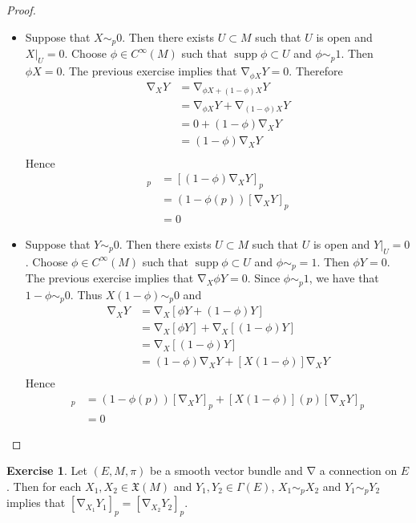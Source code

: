 \documentclass{book}
\theoremstyle{definition}
\newtheorem{ex}[definition]{Exercise}
\newcommand{\Gam}{\Gamma}
\newcommand{\MFX}{\mathfrak{X}}
\DeclareMathOperator{\supp}{supp}
\DeclareMathOperator{\nab}{\nabla}
\DeclareMathOperator*{\0}{\mbf{0}}
\DeclareMathOperator*{\1}{\mbf{1}}
\begin{document}
	\begin{proof}\
		\begin{itemize}
			\item Suppose that $X \sim_p 0$. Then there exists $U \subset M$ such that $U$ is open and $X|_U = 0$. Choose $\phi  \in C^{\infty}(M)$ such that $\supp \phi  \subset U$ and $\phi \sim_p 1$. Then $\phi  X = 0$. The previous exercise implies that $\nab_{\phi  X} Y = 0$. Therefore
			\begin{align*}
				\nab_X Y
				& = \nab_{\phi  X + (1- \phi )X}Y \\
				& = \nab_{\phi  X}Y + \nab_{(1 - \phi ) X}Y \\
				& = 0 + (1 - \phi )\nab_X Y \\
				& = (1 - \phi )\nab_X Y \\
			\end{align*}
			Hence 
			\begin{align*}
				[\nab_X Y]_p
				& =[(1 - \phi )\nab_X Y]_p \\
				& = (1 - \phi (p))[\nab_X Y]_p \\
				& = 0 
			\end{align*} 
			\item Suppose that $Y \sim_p 0$. Then there exists $U \subset M$ such that $U$ is open and $Y|_U = 0$. Choose $\phi \in C^{\infty}(M)$ such that $\supp \phi  \subset U$ and $\phi \sim_p = 1$. Then $\phi  Y = 0$. The previous exercise implies that $\nab_X \phi Y = 0$. Since $\phi \sim_p 1$, we have that $1 - \phi \sim_p 0$. Thus $X (1 - \phi) \sim_p 0$ and 
			\begin{align*}
				\nab_X Y
				& = \nab_X [\phi Y + (1- \phi)Y] \\
				& = \nab_X [\phi Y] + \nab_X[(1 - \phi) Y] \\
				& = \nab_X[(1 - \phi) Y] \\
				& = (1- \phi) \nab_X Y + [X(1 - \phi)] \nab_X Y \\
			\end{align*}
			Hence
			\begin{align*}
				[\nab_X Y]_p
				& = (1- \phi(p)) [\nab_X Y]_p + [X(1 - \phi)](p) [\nab_X Y]_p \\ 
				& = 0
			\end{align*} 
		\end{itemize}
	\end{proof}

	\begin{ex}
		Let $(E, M, \pi)$ be a smooth vector bundle and $\nab$ a connection on $E$. Then for each $X_1, X_2 \in \MFX(M)$ and $Y_1, Y_2 \in \Gam(E)$, $X_1 \sim_p X_2$ and $Y_1 \sim_p Y_2$ implies that $[\nab_{X_1}Y_1]_p = [\nab_{X_2}Y_2]_p $.
	\end{ex}
\end{document}
